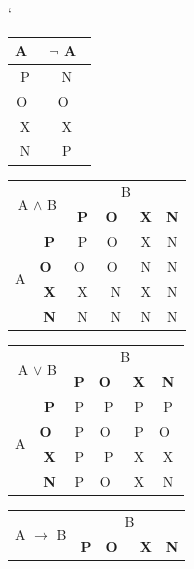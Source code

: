 \documentclass[11pt,a4paper]{article}
\begin{document}
\begin{table}[h]
    \catcode`
    \begin{center}
    \begin{tabular}{|c|c|}
        \hline
        A~& $\neg$ A~\\ \hline
        P & N \\ \hline
        O~& O~\\ \hline
        X & X \\ \hline
        N & P \\ \hline
    \end{tabular}
    \begin{tabular}{|c|c|c|c|c|c|}
        \hline
        \multicolumn{2}{|c|}{\multirow{2}{*}{A $\wedge$ B}} & \multicolumn{4}{|c|}{B} \\ \cline{3-6}
        \multicolumn{2}{|c|}{} & \bf P & \bf O~& \bf X & \bf N \\ \hline
        \multirow{4}{*}{A} & \bf P &  P &  O~&  X &  N \\ \cline{2-6}
        \multirow{4}{*}{} & \bf O~&  O~&  O~&  N &  N \\  \cline{2-6}
        \multirow{4}{*}{} & \bf X &  X &  N &  X &  N \\  \cline{2-6}
        \multirow{4}{*}{} & \bf N &  N &  N &  N &  N \\  \cline{2-6}
        \hline
    \end{tabular}
    \begin{tabular}{|c|c|c|c|c|c|}
        \hline
        \multicolumn{2}{|c|}{\multirow{2}{*}{A $\vee$ B}} & \multicolumn{4}{|c|}{B} \\ \cline{3-6}
        \multicolumn{2}{|c|}{} & \bf P & \bf O~& \bf X & \bf N \\ \hline
        \multirow{4}{*}{A} & \bf P &  P &  P &  P &  P \\ \cline{2-6}
        \multirow{4}{*}{} & \bf O~&  P &  O~&  P &  O~\\  \cline{2-6}
        \multirow{4}{*}{} & \bf X &  P &  P &  X &  X \\  \cline{2-6}
        \multirow{4}{*}{} & \bf N &  P &  O~&  X &  N \\  \cline{2-6}
        \hline
    \end{tabular}
    \begin{tabular}{|c|c|c|c|c|c|}
        \hline
        \multicolumn{2}{|c|}{\multirow{2}{*}{A $\to$ B}} & \multicolumn{4}{|c|}{B} \\ \cline{3-6}
        \multicolumn{2}{|c|}{} & \bf P & \bf O~& \bf X & \bf N \\ \hline

\end{tabular}
\end{center}
\end{table}
\end{document}
